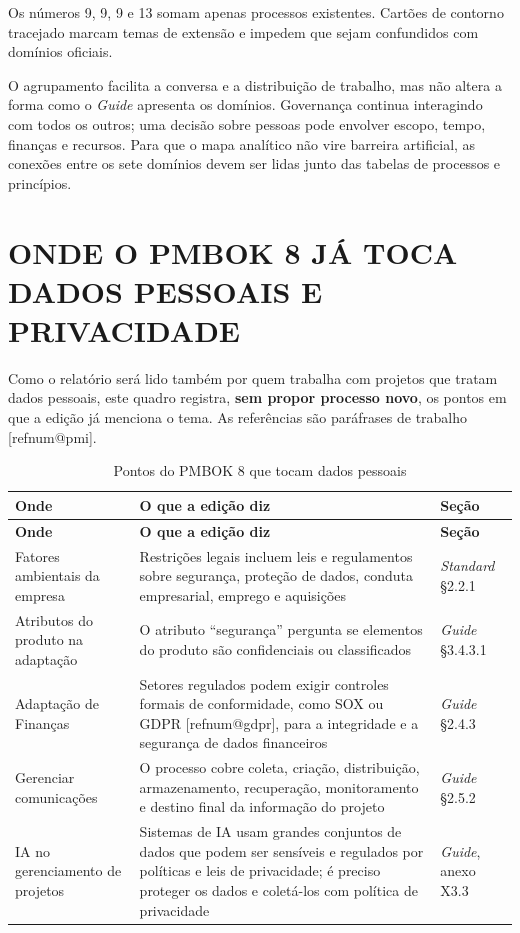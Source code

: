 \documentclass[12pt,a4paper,article,oneside,english,brazil]{abntex2}
\makeatletter
\newcommand{\fontetab}[1]{\par\vspace{3pt}{\small\noindent Fonte: #1\par}}
\newcommand{\refnum}[1]{\csname refnum@#1\endcsname}
\newcommand{\cit}[1]{[\refnum{#1}]}
\makeatother
\begin{document}
Os números 9, 9, 9 e 13 somam apenas processos existentes. Cartões de contorno tracejado marcam temas de extensão e impedem que sejam confundidos com domínios oficiais.

O agrupamento facilita a conversa e a distribuição de trabalho, mas não altera a forma como o \textit{Guide} apresenta os domínios. Governança continua interagindo com todos os outros; uma decisão sobre pessoas pode envolver escopo, tempo, finanças e recursos. Para que o mapa analítico não vire barreira artificial, as conexões entre os sete domínios devem ser lidas junto das tabelas de processos e princípios.

\section{ONDE O PMBOK 8 JÁ TOCA DADOS PESSOAIS E PRIVACIDADE}

Como o relatório será lido também por quem trabalha com projetos que tratam dados pessoais, este quadro registra, \textbf{sem propor processo novo}, os pontos em que a edição já menciona o tema. As referências são paráfrases de trabalho [\refnum{pmi}].

\begingroup\SingleSpacing\small
\begin{longtable}{@{}>{\raggedright\arraybackslash}p{}>{\raggedright\arraybackslash}p{}>{\raggedright\arraybackslash}p{}@{}}
\caption{Pontos do PMBOK 8 que tocam dados pessoais}\label{tab:t13}\\
\hline
\textbf{Onde} & \textbf{O que a edição diz} & \textbf{Seção}\\
\hline
\endfirsthead
\hline
\textbf{Onde} & \textbf{O que a edição diz} & \textbf{Seção}\\
\hline
\endhead
\hline
\endfoot
\hline
\endlastfoot
Fatores ambientais da empresa & Restrições legais incluem leis e regulamentos sobre segurança, proteção de dados, conduta empresarial, emprego e aquisições & \textit{Standard} §2.2.1\\[3pt]
Atributos do produto na adaptação & O atributo \textquotedblleft{}segurança\textquotedblright{} pergunta se elementos do produto são confidenciais ou classificados & \textit{Guide} §3.4.3.1\\[3pt]
Adaptação de Finanças & Setores regulados podem exigir controles formais de conformidade, como SOX ou GDPR [\refnum{gdpr}], para a integridade e a segurança de dados financeiros & \textit{Guide} §2.4.3\\[3pt]
Gerenciar comunicações & O processo cobre coleta, criação, distribuição, armazenamento, recuperação, monitoramento e destino final da informação do projeto & \textit{Guide} §2.5.2\\[3pt]
IA no gerenciamento de projetos & Sistemas de IA usam grandes conjuntos de dados que podem ser sensíveis e regulados por políticas e leis de privacidade; é preciso proteger os dados e coletá-los com política de privacidade & \textit{Guide}, anexo X3.3\\[3pt]
\end{longtable}
\endgroup
\fontetab{Elaborado pelos autores (2026), com base em \cit{pmi}.}
\end{document}
